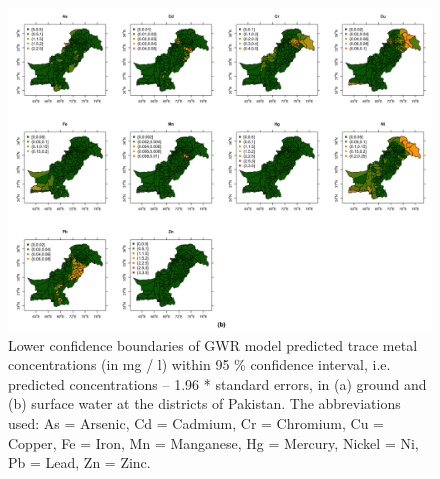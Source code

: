 \newpage

\begin{landscape}

\begin{figure}[hp!]
  \centering
  \vspace{-2.5cm} \includegraphics[width=\linewidth]{Figures/Fig_D_3_b.png}
  \caption{Lower confidence boundaries of GWR model predicted trace metal concentrations (in mg / l) within 95 \% confidence interval, i.e. predicted concentrations – 1.96 * standard errors, in (a) ground and (b) surface water at the districts of Pakistan.  The abbreviations used: As = Arsenic, Cd = Cadmium, Cr = Chromium, Cu = Copper, Fe = Iron, Mn = Manganese, Hg = Mercury, Nickel = Ni, Pb = Lead, Zn = Zinc.}
  \label{Fig_D_3_b}
\end{figure}

\end{landscape}

\newpage

